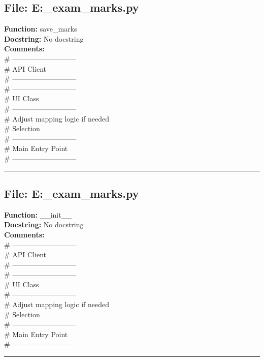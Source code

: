 {\subsection*{File: E:\project\capstone\frontend\faculty\mst_exam_marks.py}
\textbf{Function:} save_marks\\
\textbf{Docstring:} No docstring\\
\textbf{Comments:}\\
# ---------------------------\\
# API Client\\
# ---------------------------\\
# ---------------------------\\
# UI Class\\
# ---------------------------\\
# Adjust mapping logic if needed\\
# Selection\\
# ---------------------------\\
# Main Entry Point\\
# ---------------------------\\

\hrule

\subsection*{File: E:\project\capstone\frontend\faculty\mst_exam_marks.py}
\textbf{Function:} __init__\\
\textbf{Docstring:} No docstring\\
\textbf{Comments:}\\
# ---------------------------\\
# API Client\\
# ---------------------------\\
# ---------------------------\\
# UI Class\\
# ---------------------------\\
# Adjust mapping logic if needed\\
# Selection\\
# ---------------------------\\
# Main Entry Point\\
# ---------------------------\\

\hrule

}
